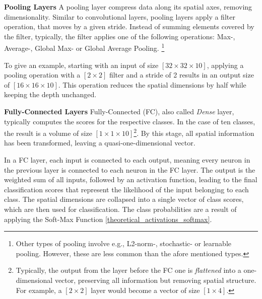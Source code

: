 \vspace{1em}

\textbf{Pooling Layers}\label{theoretical_classification_pooling_layers}
A pooling layer compress data along its spatial axes, removing dimensionality. Similar to convolutional layers, pooling layers apply a filter operation, that moves by a given stride. Instead of summing elements covered by the filter, typically, the filter applies one of the following operations: Max-, Average-, Global Max- or Global Average Pooling. \footnote{Other types of pooling involve e.g., L2-norm-, stochastic- or learnable pooling. However, these are less common than the afore mentioned types.}

To give an example, starting with an input of size $[32 \times 32 \times 10]$, applying a pooling operation with a $[2 \times 2]$ filter and a stride of 2 results in an output size of $[16 \times 16 \times 10]$. This operation reduces the spatial dimensions by half while keeping the depth unchanged.

\vspace{1em}

\textbf{Fully-Connected Layers}\label{theoretical_classification_fully_connected_layers}
Fully-Connected (FC), also called \textit{Dense} layer, typically computes the scores for the respective classes. In the case of ten classes, the result is a volume of size $[1 \times 1 \times 10]$\footnote{Typically, the output from the layer before the FC one is \textit{flattened} into a one-dimensional vector, preserving all information but removing spatial structure. For example, a $[2 \times 2]$ layer would become a vector of size $[1 \times 4]$.}. By this stage, all spatial information has been transformed, leaving a quasi-one-dimensional vector. 

In a FC layer, each input is connected to each output, meaning every neuron in the previous layer is connected to each neuron in the FC layer. The output is the weighted sum of all inputs, followed by an activation function, leading to the final classification scores that represent the likelihood of the input belonging to each class. The spatial dimensions are collapsed into a single vector of class scores, which are then used for classification. The class probabilities are a result of applying the Soft-Max Function \ref{theoretical_activations_softmax}. 

